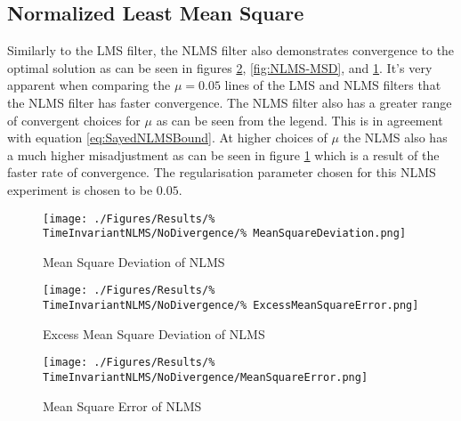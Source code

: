 \subsection{Normalized Least Mean Square}
\FloatBarrier
Similarly to the LMS filter, the NLMS filter also demonstrates %
convergence to the optimal solution as can be %
seen in figures \ref{fig:NLMS-MSE}, \ref{fig:NLMS-MSD}, %
and \ref{fig:NLMS-EMSE}. It's very apparent when %
comparing the $\mu = 0.05$ lines of the LMS and NLMS filters %
that the NLMS filter has faster convergence. The NLMS filter %
also has a greater range of convergent choices for %
$\mu$ as can be seen from the legend. This is in agreement %
with equation \ref{eq:SayedNLMSBound}. At higher choices of %
$\mu$ the NLMS also has a much higher misadjustment as can be %
seen in figure \ref{fig:NLMS-EMSE} which is a result of the %
faster rate of convergence. The regularisation parameter chosen %
for this NLMS experiment is chosen to be $0.05$.

\begin{figure}[ht]
	\centering
	\begin{minipage}{0.49\textwidth}
		\texttt{[image: ./Figures/Results/\%
		TimeInvariantNLMS/NoDivergence/\%
		MeanSquareDeviation.png]}
		\captionsetup{width=0.75\linewidth}
		\caption{Mean Square Deviation of NLMS}
		\label{fig:NLMS-MSD}
	\end{minipage}
	\begin{minipage}{0.49\textwidth}
		\texttt{[image: ./Figures/Results/\%
		TimeInvariantNLMS/NoDivergence/\%
		ExcessMeanSquareError.png]}
		\captionsetup{width=0.75\linewidth}
		\caption{Excess Mean Square Deviation of NLMS}
		\label{fig:NLMS-EMSE}
	\end{minipage}
\end{figure}
\begin{figure}[ht]
	\centering
	\texttt{[image: ./Figures/Results/\%
	TimeInvariantNLMS/NoDivergence/MeanSquareError.png]}
	\captionsetup{width=0.75\linewidth}
	\caption{Mean Square Error of NLMS}
	\label{fig:NLMS-MSE}
\end{figure}

